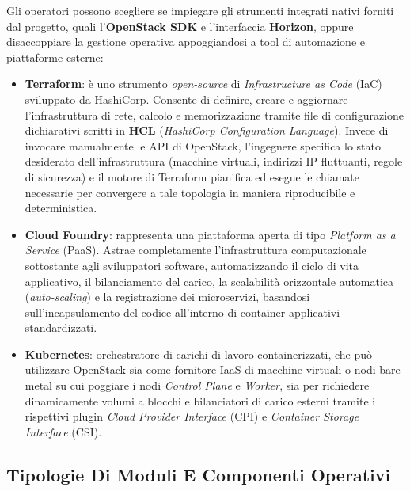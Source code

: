 \documentclass[11pt, a4paper]{article}
\begin{document}
Gli operatori possono scegliere se impiegare gli strumenti integrati nativi forniti dal progetto, quali l'\textbf{OpenStack SDK} e l'interfaccia \textbf{Horizon}, oppure disaccoppiare la gestione operativa appoggiandosi a tool di automazione e piattaforme esterne:
\begin{itemize}
    \item \textbf{Terraform}: è uno strumento \emph{open-source} di \emph{Infrastructure as Code} (IaC) sviluppato da HashiCorp. Consente di definire, creare e aggiornare l'infrastruttura di rete, calcolo e memorizzazione tramite file di configurazione dichiarativi scritti in \textbf{HCL} (\emph{HashiCorp Configuration Language}). Invece di invocare manualmente le API di OpenStack, l'ingegnere specifica lo stato desiderato dell'infrastruttura (macchine virtuali, indirizzi IP fluttuanti, regole di sicurezza) e il motore di Terraform pianifica ed esegue le chiamate necessarie per convergere a tale topologia in maniera riproducibile e deterministica.
    \item \textbf{Cloud Foundry}: rappresenta una piattaforma aperta di tipo \emph{Platform as a Service} (PaaS). Astrae completamente l'infrastruttura computazionale sottostante agli sviluppatori software, automatizzando il ciclo di vita applicativo, il bilanciamento del carico, la scalabilità orizzontale automatica (\emph{auto-scaling}) e la registrazione dei microservizi, basandosi sull'incapsulamento del codice all'interno di container applicativi standardizzati.
    \item \textbf{Kubernetes}: orchestratore di carichi di lavoro containerizzati, che può utilizzare OpenStack sia come fornitore IaaS di macchine virtuali o nodi bare-metal su cui poggiare i nodi \emph{Control Plane} e \emph{Worker}, sia per richiedere dinamicamente volumi a blocchi e bilanciatori di carico esterni tramite i rispettivi plugin \emph{Cloud Provider Interface} (CPI) e \emph{Container Storage Interface} (CSI).
\end{itemize}

\subsection{Tipologie Di Moduli E Componenti Operativi}
\end{document}

